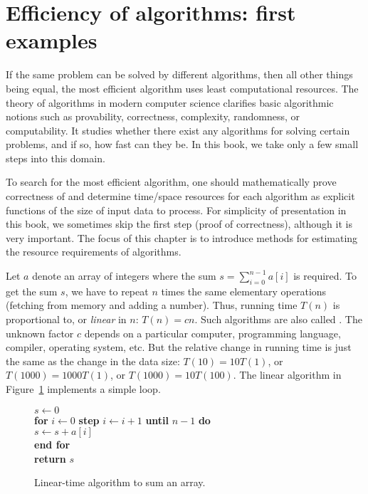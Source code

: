 \section{Efficiency of algorithms: first examples}
\label{sec:efficiency}

If the same problem can be solved by different algorithms, then all other
things being equal, the most efficient algorithm uses least computational
resources. The theory of algorithms in modern computer science clarifies
basic algorithmic notions such as provability, correctness, complexity,
randomness, or computability. It studies  whether there exist any
algorithms for solving certain problems, and if so, how fast can they
be. In this book, we take only a  few small steps into this domain.

To search for the most efficient algorithm, one should mathematically
prove correctness of and determine time/space resources for each
algorithm as explicit functions of the size of input data to process.
For simplicity of presentation in this book, we sometimes skip the first 
step (proof of correctness), although it is very important. The focus of this 
chapter is to introduce methods for estimating the resource requirements of 
algorithms.

\begin{Example}
\label{ex:lin:sum} 
Let $a$ denote an array of integers where the sum
\(
s = \sum_{i=0}^{n-1} a[i]
\) is required.
To get the sum \(s\), we have to repeat \(n\) times  
the same elementary operations (fetching 
from memory and adding a number). Thus, running time $T(n)$
is proportional to, or \emph{linear} in $n$: 
\( T(n) = c  n \). Such
algorithms are also called . The unknown  
factor $c$ depends on a particular computer, 
programming language, compiler, operating system, etc. But 
the relative change in running time is 
just the same as the change in the data size:  
$T(10) = 10  T(1)$, or $T(1000) = 1000  T(1)$, 
or $T(1000)=10 T(100)$. The linear 
algorithm in Figure~\ref{fig:alg-linsum} implements a simple loop.

\begin{figure}
\hspace*{1.2in}\begin{minipage}{5in}
{
\> \(s \leftarrow 0\)\\
\> \textbf{for} \(i \leftarrow  0\) \textbf{step} \(i \leftarrow i+1\)
                            \textbf{until} \(n-1\) \textbf{do}\\
\> \> \(s \leftarrow s + a[i] \) \\
\> \textbf{end for} \\
\> \textbf{return} $s$\\
}
\end{minipage}
\caption{Linear-time algorithm to sum an array.}
\label{fig:alg-linsum}
\end{figure}

\end{Example}


